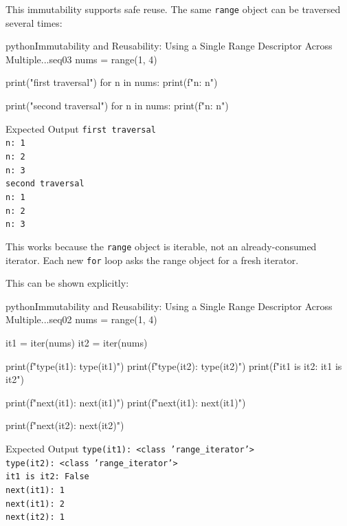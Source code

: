 \documentclass[a4paper,twoside]{report}
\begin{document}
This immutability supports safe reuse. The same \texttt{range} object can be traversed several times:

\begin{codebox}[]{python}{Immutability and Reusability: Using a Single Range Descriptor Across Multiple...}{seq03}
nums = range(1, 4)

print("first traversal")
for n in nums:
    print(f"n: {n}")

print("second traversal")
for n in nums:
    print(f"n: {n}")
\end{codebox}


\begin{iobox}{Expected Output}
\texttt{first traversal} \\
\texttt{n: 1} \\
\texttt{n: 2} \\
\texttt{n: 3} \\
\texttt{second traversal} \\
\texttt{n: 1} \\
\texttt{n: 2} \\
\texttt{n: 3} \\
\end{iobox}


This works because the \texttt{range} object is iterable, not an already-consumed iterator. Each new \texttt{for} loop asks the range object for a fresh iterator.

This can be shown explicitly:

\begin{codebox}[]{python}{Immutability and Reusability: Using a Single Range Descriptor Across Multiple...}{seq02}
nums = range(1, 4)

it1 = iter(nums)
it2 = iter(nums)

print(f"type(it1): {type(it1)}")
print(f"type(it2): {type(it2)}")
print(f"it1 is it2: {it1 is it2}")

print(f"next(it1): {next(it1)}")
print(f"next(it1): {next(it1)}")

print(f"next(it2): {next(it2)}")
\end{codebox}


\begin{iobox}{Expected Output}
\texttt{type(it1): <class 'range\_iterator'>} \\
\texttt{type(it2): <class 'range\_iterator'>} \\
\texttt{it1 is it2: False} \\
\texttt{next(it1): 1} \\
\texttt{next(it1): 2} \\
\texttt{next(it2): 1} \\
\end{iobox}
\end{document}
